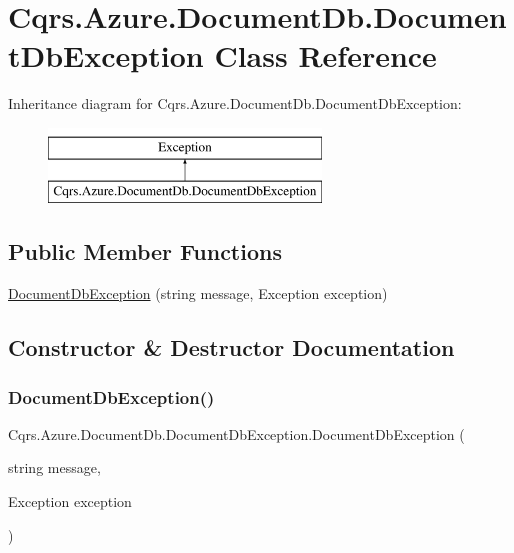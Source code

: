 \hypertarget{classCqrs_1_1Azure_1_1DocumentDb_1_1DocumentDbException}{}\section{Cqrs.\+Azure.\+Document\+Db.\+Document\+Db\+Exception Class Reference}
\label{classCqrs_1_1Azure_1_1DocumentDb_1_1DocumentDbException}
Inheritance diagram for Cqrs.\+Azure.\+Document\+Db.\+Document\+Db\+Exception\+:\begin{figure}[H]
\begin{center}
\leavevmode
\includegraphics[height=2.000000cm]{classCqrs_1_1Azure_1_1DocumentDb_1_1DocumentDbException}
\end{center}
\end{figure}
\subsection*{Public Member Functions}
\begin{DoxyCompactItemize}
\item 
\hyperlink{classCqrs_1_1Azure_1_1DocumentDb_1_1DocumentDbException_a19e08be1e69ac87230e739e784f3c6b6}{Document\+Db\+Exception} (string message, Exception exception)
\end{DoxyCompactItemize}


\subsection{Constructor \& Destructor Documentation}
\mbox{\label{classCqrs_1_1Azure_1_1DocumentDb_1_1DocumentDbException_a19e08be1e69ac87230e739e784f3c6b6}} 
\subsubsection{\texorpdfstring{Document\+Db\+Exception()}{DocumentDbException()}}
{\footnotesize\ttfamily Cqrs.\+Azure.\+Document\+Db.\+Document\+Db\+Exception.\+Document\+Db\+Exception (\begin{DoxyParamCaption}\item[{string}]{message,  }\item[{Exception}]{exception }\end{DoxyParamCaption})}

